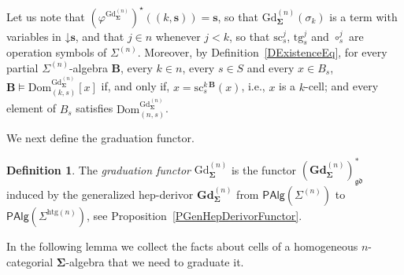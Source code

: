 \documentclass[a4paper, reqno]{amsbook}
\newcommand{\vs}[1]{\mathbin{\downarrow}#1}
\newcommand{\sig}[1]{\mathbf{#1}}             %
\newcommand{\Dom}{\mathrm{Dom}}
\newcommand{\gd}{\mathfrak{gd}}              %
\newcommand{\htg}{\mathrm{htg}}                %
\newcommand{\src}{\mathrm{sc}}
\newcommand{\tgt}{\mathrm{tg}}
\newcommand{\Gd}{\mathrm{Gd}}
\newcommand{\bGd}{\mathbf{Gd}}
\theoremstyle{plain}
\theoremstyle{definition}
\newtheorem{definition}[theorem]{Definition}
\begin{document}
Let us note that $(\varphi^{\Gd^{(n)}_{\sig{\Sigma}}})^{\star}((k,\mathbf{s}))=\mathbf{s}$, so that $\Gd^{(n)}_{\sig{\Sigma}}(\sigma_{k})$ is a term with variables in $\vs{\mathbf{s}}$, and that $j\in n$ whenever $j<k$, so that $\src^{j}_{s}$, $\tgt^{j}_{s}$ and $\circ^{j}_{s}$ are operation symbols of $\Sigma^{(n)}$.
Moreover, by Definition~\ref{DExistenceEq}, for every partial $\Sigma^{(n)}$-algebra $\mathbf{B}$, every $k\in n$, every $s\in S$ and every $x\in B_{s}$, $\mathbf{B}\models\Dom^{\Gd^{(n)}_{\sig{\Sigma}}}_{(k,s)}[x]$ if, and only if, $x=\src^{k\,\mathbf{B}}_{s}(x)$, i.e., $x$ is a $k$-cell; and every element of $B_{s}$ satisfies $\Dom^{\Gd^{(n)}_{\sig{\Sigma}}}_{(n,s)}$.

We next define the graduation functor.

\begin{definition}\label{DGdFunctor}
The \emph{graduation functor} $\Gd^{(n)}_{\sig{\Sigma}}$ is the functor $(\bGd^{(n)}_{\sig{\Sigma}})^{\ast}_{\gd}$ induced by the generalized hep-derivor $\bGd^{(n)}_{\sig{\Sigma}}$ from $\mathsf{PAlg}(\Sigma^{(n)})$ to $\mathsf{PAlg}(\Sigma^{\htg(n)})$, see Proposition~\ref{PGenHepDerivorFunctor}.
\end{definition}

In the following lemma we collect the facts about cells of a homogeneous $n$-categorial $\sig{\Sigma}$-algebra that we need to graduate it.
\end{document}
